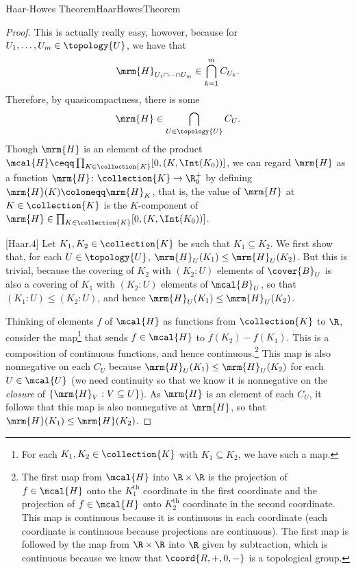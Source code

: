 \begin{thm}{Haar-Howes Theorem}{HaarHowesTheorem}
\begin{proof}
This is actually really easy, however, because for $U_1,\ldots ,U_m\in \topology{U}$, we have that
\begin{equation}
\mrm{H}_{U_1\cap \cdots \cap U_m}\in \bigcap _{k=1}^mC_{U_k}.
\end{equation}
Therefore, by quasicompactness, there is some
\begin{equation}
\mrm{H}\in \bigcap _{U\in \topology{U}}C_U.
\end{equation}
Though $\mrm{H}$ is an element of the product $\mcal{H}\ceqq \prod _{K\in \collection{K}}[0,(K,\Int (K_0))]$, we can regard $\mrm{H}$ as a function $\mrm{H}\colon \collection{K}\rightarrow \R _0^+$ by defining $\mrm{H}(K)\coloneqq \mrm{H}_K$, that is, the value of $\mrm{H}$ at $K\in \collection{K}$ is the $K$-component of $\mrm{H}\in \prod _{K\in \collection{K}}[0,(K,\Int (K_0))]$.

[Haar.4]
Let $K_1,K_2\in \collection{K}$ be such that $K_1\subseteq K_2$.  We first show that, for each $U\in \topology{U}$, $\mrm{H}_U(K_1)\leq \mrm{H}_U(K_2)$.  But this is trivial, because the covering of $K_2$ with $(K_2:U)$ elements of $\cover{B}_U$ is also a covering of $K_1$ with $(K_2:U)$ elements of $\mcal{B}_U$, so that $(K_1:U)\leq (K_2:U)$, and hence $\mrm{H}_U(K_1)\leq \mrm{H}_U(K_2)$.

Thinking of elements $f$ of $\mcal{H}$ as functions from $\collection{K}$ to $\R$, consider the map\footnote{For each $K_1,K_2\in \collection{K}$ with $K_1\subseteq K_2$, we have such a map.} that sends $f\in \mcal{H}$ to $f(K_2)-f(K_1)$.  This is a composition of continuous functions, and hence continuous.\footnote{The first map from $\mcal{H}$ into $\R \times \R$ is the projection of $f\in \mcal{H}$ onto the $K_1^{\text{th}}$ coordinate in the first coordinate and the projection of $f\in \mcal{H}$ onto $K_2^{\text{th}}$ coordinate in the second coordinate.  This map is continuous because it is continuous in each coordinate (each coordinate is continuous because projections are continuous).  The first map is followed by the map from $\R \times \R$ into $\R$ given by subtraction, which is continuous because we know that $\coord{R,+,0,-}$ is a topological group.}  This map is also nonnegative on each $C_U$ because $\mrm{H}_U(K_1)\leq \mrm{H}_U(K_2)$ for each $U\in \mcal{U}$ (we need continuity so that we know it is nonnegative on the \emph{closure} of $\{ \mrm{H}_V:V\subseteq U\}$).  As $\mrm{H}$ is an element of each $C_U$, it follows that this map is also nonnegative at $\mrm{H}$, so that $\mrm{H}(K_1)\leq \mrm{H}(K_2)$.


\end{proof}
\end{thm}

